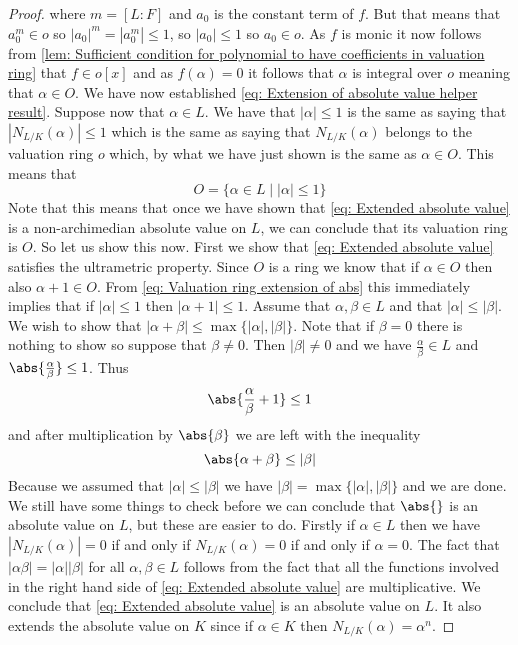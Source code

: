 \documentclass{article}
\numberwithin{equation}{section}
\begin{document}
\begin{proof}
	where $m = [L : F]$ and $a_0$ is the constant term of $f$. But that means that $a_0^m \in o$ so $|a_0|^m = |a_0^m| \leq 1$, so $|a_0| \leq 1$ so $a_0 \in o$. As $f$ is monic it now follows from \cref{lem: Sufficient condition for polynomial to have coefficients in valuation ring}  that $f \in o[x]$ and as $f(\alpha) = 0$ it follows that $\alpha$ is integral over $o$ meaning that $\alpha \in O$. We have now established \cref{eq: Extension of absolute value helper result}. Suppose now that $\alpha \in L$. We have that $|\alpha| \leq 1$ is the same as saying that $|N_{L/K}(\alpha)| \leq 1$ which is the same as saying that $N_{L/K}(\alpha)$ belongs to the valuation ring $o$ which, by what we have just shown is the same as $\alpha \in O$. This means that
	\begin{equation}\label{eq: Valuation ring extension of abs}
    	O = \{\alpha \in L \mid |\alpha| \leq 1  \}
	\end{equation}
	Note that this means that once we have shown that \cref{eq: Extended absolute value} is a non-archimedian absolute value on $L$, we can conclude that its valuation ring is $O$. So let us show this now. First we show that \cref{eq: Extended absolute value} satisfies the ultrametric property. Since $O$ is a ring we know that if $\alpha \in O$ then also $\alpha + 1 \in O$. From \cref{eq: Valuation ring extension of abs} this immediately implies that if $|\alpha|\leq 1$ then $|\alpha + 1| \leq 1$. Assume that $\alpha, \beta \in L$ and that $|\alpha| \leq |\beta|$. We wish to show that $|\alpha + \beta |\leq \max\{|\alpha|, |\beta| \}$. Note that if $\beta = 0$ there is nothing to show so suppose that $\beta \neq 0$. Then $|\beta| \neq 0$ and we have $\frac{\alpha}{\beta} \in L$ and $\abs{\frac{\alpha}{\beta}} \leq 1$. Thus
	$$\abs{\frac{\alpha}{\beta} + 1} \leq 1$$
	and after multiplication by $\abs {\beta}$ we are left with the inequality
	$$\abs{\alpha + \beta} \leq |\beta|$$
	Because we assumed that $|\alpha| \leq |\beta|$ we have $|\beta| = \max \{|\alpha|,|\beta| \}$ and we are done. We still have some things to check before we can conclude that $\abs{}$ is an absolute value on $L$, but these are easier to do. Firstly if $\alpha \in L$ then we have $|N_{L/K}(\alpha)| = 0$ if and only if $N_{L/K}(\alpha) = 0$ if and only if $\alpha = 0$. The fact that $|\alpha \beta| = |\alpha| |\beta|$ for all $\alpha,\beta \in L$ follows from the fact that all the functions involved in the right hand side of \cref{eq: Extended absolute value} are multiplicative. We conclude that \cref{eq: Extended absolute value} is an absolute value on $L$. It also extends the absolute value on $K$ since if $\alpha \in K$ then $N_{L/K}(\alpha)= \alpha^n$.


\end{proof}
\end{document}
